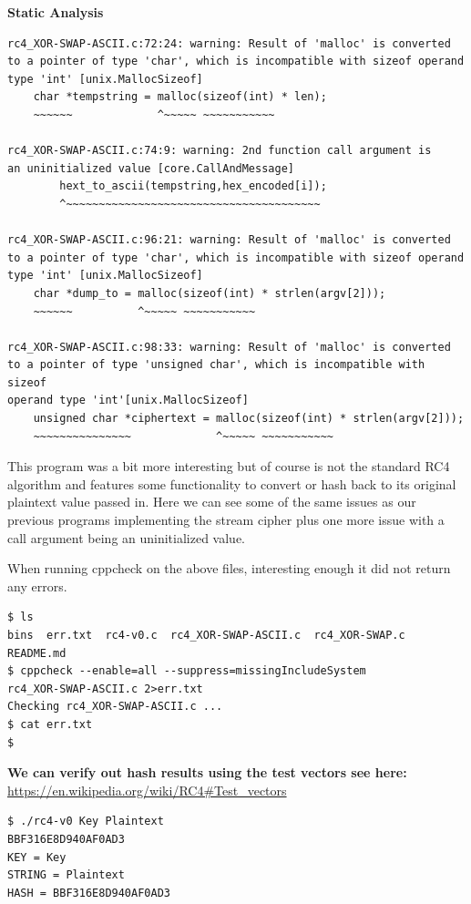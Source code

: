 \documentclass[12pt, letterpaper]{article}
\begin{document}
\begin{sloppypar}
\noindent \textbf{Static Analysis}

\begin{verbatim}
rc4_XOR-SWAP-ASCII.c:72:24: warning: Result of 'malloc' is converted 
to a pointer of type 'char', which is incompatible with sizeof operand 
type 'int' [unix.MallocSizeof]
    char *tempstring = malloc(sizeof(int) * len);
    ~~~~~~             ^~~~~~ ~~~~~~~~~~~

rc4_XOR-SWAP-ASCII.c:74:9: warning: 2nd function call argument is 
an uninitialized value [core.CallAndMessage]
        hext_to_ascii(tempstring,hex_encoded[i]);
        ^~~~~~~~~~~~~~~~~~~~~~~~~~~~~~~~~~~~~~~~

rc4_XOR-SWAP-ASCII.c:96:21: warning: Result of 'malloc' is converted 
to a pointer of type 'char', which is incompatible with sizeof operand 
type 'int' [unix.MallocSizeof]
    char *dump_to = malloc(sizeof(int) * strlen(argv[2]));
    ~~~~~~          ^~~~~~ ~~~~~~~~~~~

rc4_XOR-SWAP-ASCII.c:98:33: warning: Result of 'malloc' is converted 
to a pointer of type 'unsigned char', which is incompatible with sizeof 
operand type 'int'[unix.MallocSizeof]
    unsigned char *ciphertext = malloc(sizeof(int) * strlen(argv[2]));
    ~~~~~~~~~~~~~~~             ^~~~~~ ~~~~~~~~~~~
\end{verbatim}

This program was a bit more interesting but of course is not the
standard RC4 algorithm and features some functionality to convert or
hash back to its original plaintext value passed in. Here we can see
some of the same issues as our previous programs implementing the stream
cipher plus one more issue with a call argument being an uninitialized
value.

When running cppcheck on the above files, interesting enough it did not
return any errors.

\begin{verbatim}
$ ls
bins  err.txt  rc4-v0.c  rc4_XOR-SWAP-ASCII.c  rc4_XOR-SWAP.c  README.md
$ cppcheck --enable=all --suppress=missingIncludeSystem 
rc4_XOR-SWAP-ASCII.c 2>err.txt
Checking rc4_XOR-SWAP-ASCII.c ...
$ cat err.txt
$ 
\end{verbatim}

\noindent \textbf{We can verify out hash results using the test vectors see here:}
\url{https://en.wikipedia.org/wiki/RC4\#Test_vectors}

\begin{verbatim}
$ ./rc4-v0 Key Plaintext
BBF316E8D940AF0AD3
KEY = Key
STRING = Plaintext
HASH = BBF316E8D940AF0AD3
\end{verbatim}


\end{sloppypar}
\end{document}
